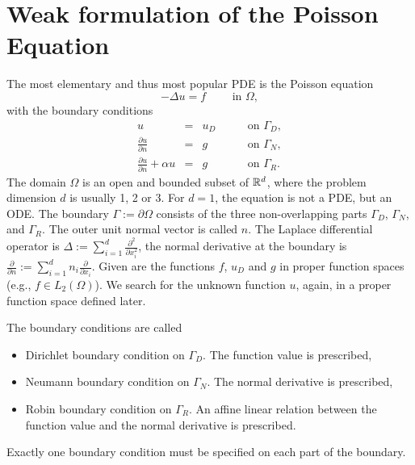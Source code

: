 \section{Weak formulation of the Poisson Equation}
\label{sec_intro}
The most elementary and thus most popular PDE is the Poisson equation
\begin{equation}
\label{equ_laplace}
-\Delta u = f \qquad \mbox{ in } \Omega,
\end{equation}
with the boundary conditions
\begin{equation}
\label{equ_laplace_bc}
\begin{array}{rcll}
u & = & u_D \qquad & \mbox{on } \Gamma_D, \\
\frac{\partial u}{\partial n} & = & g \qquad & \mbox{on } \Gamma_N, \\
\frac{\partial u}{\partial n} + \alpha u & = & g \qquad & \mbox{on } \Gamma_R.
\end{array}
\end{equation}
%
The domain $\Omega$ is an open and bounded subset of ${\mathbb R}^d$, where
the problem dimension $d$ is usually 1, 2 or 3. For $d = 1$, the
equation is not a PDE, but an ODE. The boundary $\Gamma := \partial
\Omega$ consists of the three non-overlapping parts $\Gamma_D$,
$\Gamma_N$, and $\Gamma_R$. The outer
unit normal vector is called $n$. The Laplace differential operator is
$\Delta := \sum_{i=1}^d
\frac{\partial^2}{\partial x_i^2}$, the normal derivative at the
boundary is $\frac{\partial}{\partial n} := \sum_{i=1}^d n_i
\frac{\partial}{\partial x_i}$. Given are the functions $f$, $u_D$ and
$g$ in proper function spaces (e.g., $f \in L_2(\Omega)$). We search for
the unknown function $u$, again, in a proper function space defined later. 

The boundary conditions are called
\begin{itemize}
\item 
Dirichlet boundary condition on $\Gamma_D$. The function value is prescribed,
\item
Neumann boundary condition on $\Gamma_N$. The normal derivative is prescribed,
\item
Robin boundary condition on $\Gamma_R$. An affine linear relation between
the function value and the normal derivative is prescribed.
\end{itemize}

Exactly one boundary condition must be specified on each part of the
boundary.


